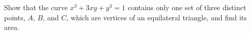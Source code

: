 Show that the curve $x^3 + 3xy + y^3 = 1$ contains only one set of three
distinct points, $A$, $B$, and $C$, which are vertices of an equilateral
triangle, and find its area.
